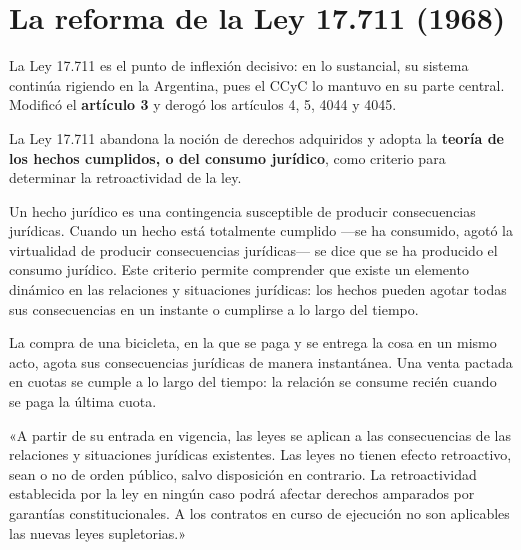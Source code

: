 \documentclass[12pt,oneside]{book}
\begin{document}
\section{La reforma de la Ley 17.711 (1968)}

La Ley 17.711 es el punto de inflexión decisivo: en lo sustancial, su sistema continúa rigiendo en la Argentina, pues el CCyC lo mantuvo en su parte central. Modificó el \textbf{artículo 3} y derogó los artículos 4, 5, 4044 y 4045.

\begin{importante}
La Ley 17.711 abandona la noción de derechos adquiridos y adopta la \textbf{teoría de los hechos cumplidos, o del consumo jurídico}, como criterio para determinar la retroactividad de la ley.
\end{importante}

\begin{definicion}
Un hecho jurídico es una contingencia susceptible de producir consecuencias jurídicas. Cuando un hecho está totalmente cumplido ---se ha consumido, agotó la virtualidad de producir consecuencias jurídicas--- se dice que se ha producido el consumo jurídico. Este criterio permite comprender que existe un elemento dinámico en las relaciones y situaciones jurídicas: los hechos pueden agotar todas sus consecuencias en un instante o cumplirse a lo largo del tiempo.
\end{definicion}

\begin{ejemplo}
La compra de una bicicleta, en la que se paga y se entrega la cosa en un mismo acto, agota sus consecuencias jurídicas de manera instantánea. Una venta pactada en cuotas se cumple a lo largo del tiempo: la relación se consume recién cuando se paga la última cuota.
\end{ejemplo}

\begin{regla}
«A partir de su entrada en vigencia, las leyes se aplican a las consecuencias de las relaciones y situaciones jurídicas existentes. Las leyes no tienen efecto retroactivo, sean o no de orden público, salvo disposición en contrario. La retroactividad establecida por la ley en ningún caso podrá afectar derechos amparados por garantías constitucionales. A los contratos en curso de ejecución no son aplicables las nuevas leyes supletorias.»
\end{regla}
\end{document}
